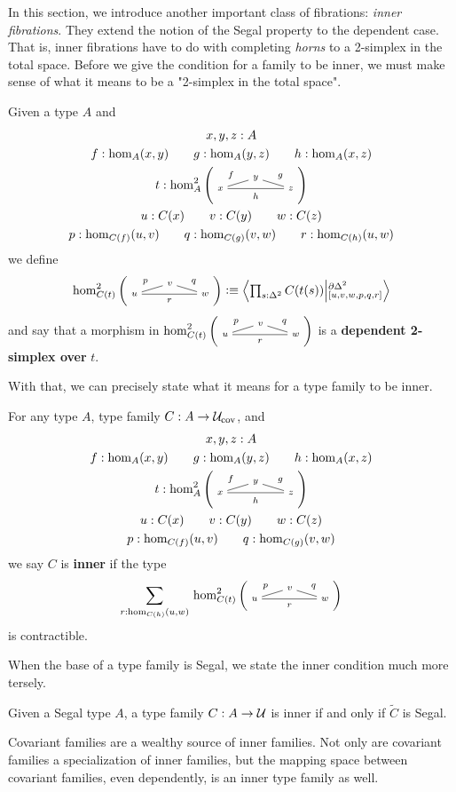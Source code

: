 \documentclass[main.tex]{subfiles}
\begin{document}
In this section, we introduce another important class of fibrations: \textit{inner fibrations}. They extend the notion of the Segal property to the dependent case. That is, 
inner fibrations have to do with completing \textit{horns} to a 2-simplex in the total space. Before we give the condition for a family
to be inner, we must make sense of what it means to be a "2-simplex in the total space".
\begin{definition}
    Given a type $A$ and
    \begin{gather*}
                          x,y,z : A  \\
    f : \ho[A]{x}{y} \qquad g : \ho[A]{y}{z} \qquad h:\ho[A]{x}{z} \\
    t : \homtwo{A}(x,y,z,f,g,h)\\
    u : C(x) \qquad v : C(y) \qquad w : C(z) \\
    p : \dho{C}{f}{u}{v} \qquad q : \dho{C}{g}{v}{w} \qquad r : \dho{C}{h}{u}{w}
    \end{gather*}
    we define
    $$\homtwo{C(t)}(u,v,w,p,q,r) \defeq \exten{s : \tsx}{C(t(s))}{\pardt}{[u,v,w,p,q,r]}$$
    and say that a morphism in $\homtwo{C(t)}(u,v,w,p,q,r)$ is a \textbf{dependent 2-simplex over} $t$.
\end{definition}
With that, we can precisely state what it means for a type family to be inner.

\begin{definition}
    For any type $A$, type family $C : A \to \mathcal{U}_\text{cov}$, and
    \begin{gather*}
    x,y,z : A  \\
    f : \ho[A]{x}{y} \qquad g : \ho[A]{y}{z} \qquad h:\ho[A]{x}{z} \\
    t : \homtwo{A}(x,y,z,f,g,h)\\
    u : C(x) \qquad v : C(y) \qquad w : C(z) \\
    p : \dho{C}{f}{u}{v} \qquad q : \dho{C}{g}{v}{w}  
    \end{gather*}
    we say $C$ is \textbf{inner} if the type 
    \begin{equation}
        \sm{r : \dho{C}{h}{u}{w}}\homtwo{C(t)}(u,v,w,p,q,r)
    \end{equation}
    is contractible.
\end{definition}

When the base of a type family is Segal, we state the inner condition much more tersely.
\begin{lemma}[BW21 Proposition 4.1.5]
    \label{lem:totbaseseginner}
    Given a Segal type $A$, a type family $C : A \to \mathcal{U}$ is inner if and only if $\widetilde{C}$ is Segal.
\end{lemma}
Covariant families are a wealthy source of inner families. Not only are covariant families a specialization of inner families, but the mapping space between covariant families, even dependently, is an inner type family as well. 
\end{document}
